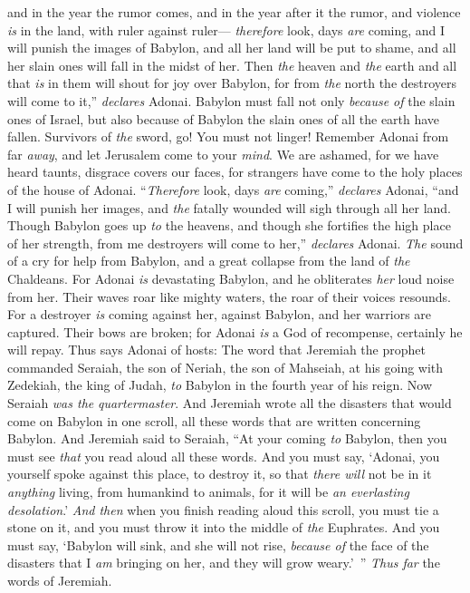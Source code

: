 \begin{biblechapter}
and in the year the rumor comes, 
and in the year after it the rumor, 
and violence \textit{is} in the land, 
with ruler against ruler—
\verse \textit{therefore} look, days \textit{are} coming, 
and I will punish the images of Babylon, 
and all her land will be put to shame, 
and all her slain ones will fall in the midst of her.
\verse Then \textit{the} heaven and \textit{the} earth and all that \textit{is} in them 
will shout for joy over Babylon, 
for from \textit{the} north 
the destroyers will come to it,” \textit{declares} Adonai.
\verse Babylon must fall not only \textit{because of} the slain ones of Israel, 
but also because of Babylon the slain ones of all the earth have fallen.
\verse Survivors of \textit{the} sword, go! 
You must not linger! 
Remember Adonai from far \textit{away}, 
and let Jerusalem come to your \textit{mind}.
\verse We are ashamed, 
for we have heard taunts, 
disgrace covers our faces, 
for strangers have come to the holy places of the house of Adonai.
\verse “\textit{Therefore} look, days \textit{are} coming,” \textit{declares} Adonai, 
“and I will punish her images, 
and \textit{the} fatally wounded will sigh through all her land.
\verse Though Babylon goes up \textit{to} the heavens, 
and though she fortifies the high place of her strength, 
from me destroyers will come to her,” \textit{declares} Adonai.
\verse \textit{The} sound of a cry for help from Babylon, 
and a great collapse from the land of \textit{the} Chaldeans.
\verse For Adonai \textit{is} devastating Babylon, 
and he obliterates \textit{her} loud noise from her. 
Their waves roar like mighty waters, 
the roar of their voices resounds.
\verse For a destroyer \textit{is} coming against her, against Babylon, 
and her warriors are captured. 
Their bows are broken; 
for Adonai \textit{is} a God of recompense, 
certainly he will repay.
\verse Thus says Adonai of hosts:
 The word that Jeremiah the prophet commanded Seraiah, the son of Neriah, the son of Mahseiah, at his going with Zedekiah, the king of Judah, \textit{to} Babylon in the fourth year of his reign. Now Seraiah \textit{was the} \textit{quartermaster}.
\verse And Jeremiah wrote all the disasters that would come on Babylon in one scroll, all these words that are written concerning Babylon.
\verse And Jeremiah said to Seraiah, “At your coming \textit{to} Babylon, then you must see \textit{that} you read aloud all these words.
\verse And you must say, ‘Adonai, you yourself spoke against this place, to destroy it, so that \textit{there will} not be in it \textit{anything} living, from humankind to animals, for it will be \textit{an everlasting desolation}.’
\verse \textit{And then} when you finish reading aloud this scroll, you must tie a stone on it, and you must throw it into the middle of \textit{the} Euphrates.
\verse And you must say, ‘Babylon will sink, and she will not rise, \textit{because of} the face of the disasters that I \textit{am} bringing on her, and they will grow weary.’ ” \textit{Thus far} the words of Jeremiah.
\end{biblechapter}


